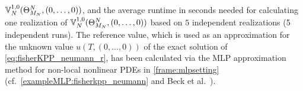 $
{\mathbb{V}}^{1,0}_N(\Theta^N_{M_N},\allowbreak (0,\ldots,0))
$,
and the average runtime in seconds needed for calculating one realization of $
{\mathbb{V}}^{1,0}_N(\Theta^N_{M_N},\allowbreak (0,\ldots,0))
$
%
based on $5$ independent realizations (5 independent runs).
%
The reference value, which is used as an approximation for the unknown value $u(T,(0,\ldots,0))$ of the exact solution of \eqref{eq:fisherKPP_neumann_r}, has been calculated via the MLP approximation method for non-local nonlinear PDEs in \cref{frame:mlpsetting} (cf.~\cref{exampleMLP:fisherkpp_neumann} and Beck et al.~\cite[Remark~3.3]{Beck2017a}).

